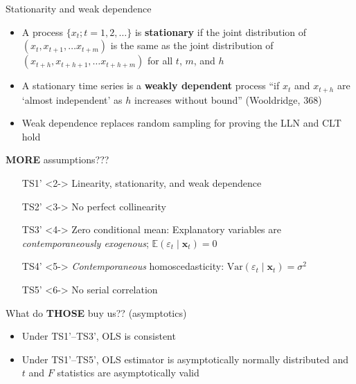 \documentclass[
  ignorenonframetext,
]{beamer}
\providecommand{\tightlist}{%
  \setlength{\itemsep}{0pt}\setlength{\parskip}{0pt}}
\newcommand{\setsep}{\setlength{\itemsep}{3pt}}
\newcommand{\setskip}{\setlength{\parskip}{3pt}}
\renewcommand{\tightlist}{\setsep\setskip}
\begin{document}
\begin{frame}{Stationarity and weak dependence}
\label{stationarity-and-weak-dependence}
\pause

\begin{itemize}[<+->]
\tightlist
\item
  A process \(\{x_t; t = 1, 2, \dots\}\) is \textbf{stationary} if the joint distribution of \(\left(x_t, x_{t+1}, \dots x_{t + m}\right)\) is the same as the joint distribution of \(\left(x_{t+h}, x_{t+h+1}, \dots x_{t+h + m}\right)\) for all \(t\), \(m\), and \(h\)
\item
  A stationary time series is a \textbf{weakly dependent} process ``if \(x_t\) and \(x_{t+h}\) are `almost independent' as \(h\) increases without bound'' (Wooldridge, 368)
\item
  Weak dependence replaces random sampling for proving the LLN and CLT hold
\end{itemize}
\end{frame}

\begin{frame}{\textbf{MORE} assumptions???}
\label{more-assumptions-1}
\begin{itemize}
    \setlength{\itemsep}{3pt}\setlength{\parskip}{3pt}
    \item[TS1']<2-> Linearity, stationarity, and weak dependence
    \item[TS2']<3-> No perfect collinearity
    \item[TS3']<4-> Zero conditional mean: Explanatory variables are \textit{contemporaneously exogenous}; $\mathbb{E}\left(\varepsilon_t\mid\mathbf{x}_t\right) = 0$
    \item[TS4']<5-> \textit{Contemporaneous} homoscedasticity: $\text{Var}\left(\varepsilon_t\mid\mathbf{x}_t\right) = \sigma^2$
    \item[TS5']<6-> No serial correlation
\end{itemize}
\end{frame}

\begin{frame}{What do \textbf{THOSE} buy us?? (asymptotics)}
\label{what-do-those-buy-us-asymptotics}
\pause

\begin{itemize}[<+->]
\tightlist
\item
  Under TS1'--TS3', OLS is consistent
\item
  Under TS1'--TS5', OLS estimator is asymptotically normally distributed and \(t\) and \(F\) statistics are asymptotically valid
\end{itemize}
\end{frame}
\end{document}
